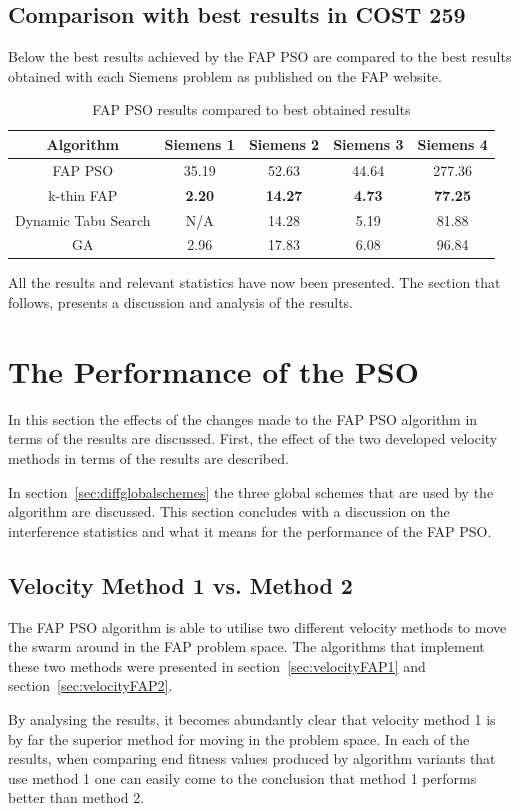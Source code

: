 \subsection{Comparison with best results in COST 259}
Below the best results achieved by the FAP PSO are compared to the best results obtained with each Siemens problem as published on the FAP website\cite{FAPWeb}.
\begin{table}[H]
\centering
\begin{tabular}{ccccc}
	\toprule
	Algorithm & Siemens 1 & Siemens 2 & Siemens 3 & Siemens 4 \\
    \midrule
	FAP PSO & 35.19 & 52.63 & 44.64 & 277.36 \\ 
	k-thin FAP & \textbf{2.20} & \textbf{14.27} & \textbf{4.73} & \textbf{77.25} \\ 
    Dynamic Tabu Search & \scriptsize{N/A} & 14.28 & 5.19 & 81.88 \\
	GA & 2.96 & 17.83 & 6.08 & 96.84 \\
    \bottomrule
	\end{tabular}
\caption{FAP PSO results compared to best obtained results}
\label{tab:allbest}
\end{table}


All the results and relevant statistics have now been presented. The section that follows, presents a discussion and analysis of the results.
\section{The Performance of the PSO}
In this section the effects of the changes made to the FAP PSO algorithm in terms of the results are discussed. First, the effect of the two developed velocity methods in terms of the results are described. 

In section~\ref{sec:diffglobalschemes} the three global schemes that are used by the algorithm are discussed. This section concludes with a discussion on the interference statistics and what it means for the performance of the FAP PSO.
\subsection{Velocity Method 1 vs. Method 2}
The FAP PSO algorithm is able to utilise two different velocity methods to move the swarm around in the FAP problem space. The algorithms that implement these two methods were presented in section~\ref{sec:velocityFAP1} and section~\ref{sec:velocityFAP2}.

By analysing the results, it becomes abundantly clear that velocity method 1 is by far the superior method for moving in the problem space. In each of the results, when comparing end fitness values produced by algorithm variants that use method 1 one can easily come to the conclusion that method 1 performs better than method 2.

